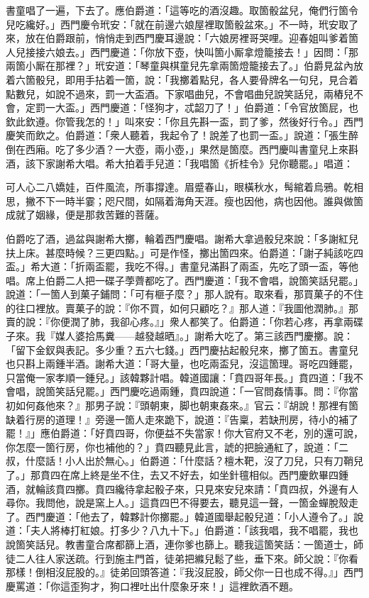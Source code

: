書童唱了一遍，下去了。應伯爵道：「這等吃的酒沒趣。取箇骰盆兒，俺們行箇令兒吃纔好。」西門慶令玳安：「就在前邊六娘屋裡取箇骰盆來。」不一時，玳安取了來，放在伯爵跟前，悄悄走到西門慶耳邊說：「六娘房裡哥哭哩。迎春姐叫爹着箇人兒接接六娘去。」西門慶道：「你放下壺，快叫箇小厮拿燈籠接去！」因問：「那兩箇小厮在那裡？」玳安道：「琴童與棋童兒先拿兩箇燈籠接去了。」伯爵見盆內放着六箇骰兒，即用手拈着一箇，說：「我擲着點兒，各人要骨牌名一句兒，見合着點數兒，如說不過來，罰一大盃酒。下家唱曲兒，不會唱曲兒說笑話兒，兩樁兒不會，定罰一大盃。」西門慶道：「怪狗才，忒韶刀了！」伯爵道：「令官放箇屁，也欽此欽遵。你管我怎的！」叫來安：「你且先斟一盃，罰了爹，然後好行令。」西門慶笑而飲之。伯爵道：「衆人聽着，我起令了！說差了也罰一盃。」說道：「張生醉倒在西廂。吃了多少酒？一大壺，兩小壺，」果然是箇麼。西門慶叫書童兒上來斟酒，該下家謝希大唱。希大拍着手兒道：「我唱箇《折桂令》兒你聽罷。」唱道：

\begin{myquote} 
可人心二八嬌娃，百件風流，所事撐達。眉蹙春山，眼橫秋水，髩綰着烏鴉。乾相思，撇不下一時半霎；咫尺間，如隔着海角天涯。瘦也因他，病也因他。誰與做箇成就了姻緣，便是那救苦難的菩薩。
\end{myquote} 

伯爵吃了酒，過盆與謝希大擲，輪着西門慶唱。謝希大拿過骰兒來說：「多謝紅兒扶上床。甚麼時候？三更四點。」可是作怪，擲出箇四來。伯爵道：「謝子純該吃四盃。」希大道：「折兩盃罷，我吃不得。」書童兒滿斟了兩盃，先吃了頭一盃，等他唱。席上伯爵二人把一碟子荸薺都吃了。西門慶道：「我不會唱，說箇笑話兒罷。」說道：「一箇人到菓子鋪問：「可有榧子麼？」那人說有。取來看，那買菓子的不住的往口裡放。賣菓子的說：『你不買，如何只顧吃？』那人道：『我圖他潤肺。』那賣的說：『你便潤了肺，我卻心疼。』」衆人都笑了。伯爵道：「你若心疼，再拿兩碟子來。我『媒人婆拾馬糞——越發越晒』。」{}謝希大吃了。第三該西門慶擲。說：「留下金釵與表記。多少重？五六七錢。」西門慶拈起骰兒來，擲了箇五。書童兒也只斟上兩鍾半酒。謝希大道：「哥大量，也吃兩盃兒，沒這箇理。哥吃四鍾罷，只當俺一家孝順一鍾兒。」該韓夥計唱。韓道國讓：「賁四哥年長。」賁四道：「我不會唱，說箇笑話兒罷。」西門慶吃過兩鍾，賁四說道：「一官問姦情事。問：『你當初如何姦他來？』那男子說：『頭朝東，脚也朝東姦來。』官云：『胡說！那裡有箇缺着行房的道理！』旁邊一箇人走來跪下，說道：『告稟，若缺刑房，待小的補了罷！』」應伯爵道：「好賁四哥，你便益不失當家！你大官府又不老，別的還可說，你怎麼一箇行房，你也補他的？」{}賁四聽見此言，諕的把臉通紅了，說道：「二叔，什麼話！小人出於無心。」伯爵道：「什麼話？檀木靶，沒了刀兒，只有刀鞘兒了。」{}那賁四在席上終是坐不住，去又不好去，如坐針氊相似。西門慶飲畢四鍾酒，就輪該賁四擲。賁四纔待拿起骰子來，只見來安兒來請：「賁四叔，外邊有人尋你。我問他，說是窯上人。」這賁四巴不得要去，聽見這一聲，一箇金蟬脫殼走了。西門慶道：「他去了，韓夥計你擲罷。」韓道國舉起骰兒道：「小人遵令了。」說道：「夫人將棒打紅娘。打多少？八九十下。」伯爵道：「該我唱，我不唱罷，我也說箇笑話兒。教書童合席都篩上酒，連你爹也篩上。聽我這箇笑話：一箇道士，師徒二人往人家送疏。行到施主門首，徒弟把縧兒鬆了些，垂下來。師父說：『你看那樣！倒相沒屁股的。』徒弟回頭答道：『我沒屁股，師父你一日也成不得。』」西門慶罵道：「你這歪狗才，狗口裡吐出什麼象牙來！」這裡飲酒不題。

